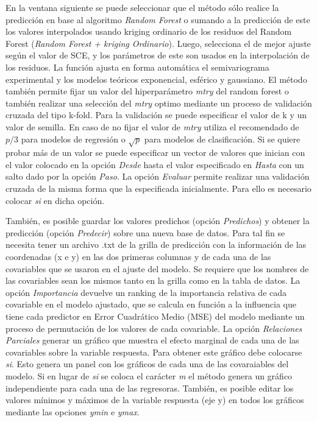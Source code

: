 \documentclass[11pt,b5paper,]{krantz}
\begin{document}
En la ventana siguiente se puede seleccionar que el método sólo realice la predicción en base al algoritmo \emph{Random Forest} o sumando a la predicción de este los valores interpolados usando kriging ordinario de los residuos del Random Forest (\emph{Random Forest + kriging Ordinario}). Luego, selecciona el de mejor ajuste según el valor de SCE, y los parámetros de este son usados en la interpolación de los residuos. La función ajusta en forma automática el semivariograma experimental y los modelos teóricos exponencial, esférico y gaussiano. El método también permite fijar un valor del hiperparámetro \emph{mtry} del random forest o también realizar una selección del \emph{mtry} optimo mediante un proceso de validación cruzada del tipo k-fold. Para la validación se puede especificar el valor de k y un valor de semilla. En caso de no fijar el valor de \emph{mtry} utiliza el recomendado de \(p/3\) para modelos de regresión o \(\sqrt{p}\) para modelos de clasificación. Si se quiere probar más de un valor se puede especificar un vector de valores que inician con el valor colocado en la opción \emph{Desde} hasta el valor especificado en \emph{Hasta} con un salto dado por la opción \emph{Paso}. La opción \emph{Evaluar} permite realizar una validación cruzada de la misma forma que la especificada inicialmente. Para ello es necesario colocar \emph{si} en dicha opción.

También, es posible guardar los valores predichos (opción \emph{Predichos}) y obtener la predicción (opción \emph{Predecir}) sobre una nueva base de datos. Para tal fin se necesita tener un archivo .txt de la grilla de predicción con la información de las coordenadas (x e y) en las dos primeras columnas y de cada una de las covariables que se usaron en el ajuste del modelo. Se requiere que los nombres de las covariables sean los mismos tanto en la grilla como en la tabla de datos. La opción \emph{Importancia} devuelve un ranking de la importancia relativa de cada covariable en el modelo ajustado, que se calcula en función a la influencia que tiene cada predictor en Error Cuadrático Medio (MSE) del modelo mediante un proceso de permutación de los valores de cada covariable. La opción \emph{Relaciones Parciales} generar un gráfico que muestra el efecto marginal de cada una de las covariables sobre la variable respuesta. Para obtener este gráfico debe colocarse \emph{si}. Esto genera un panel con los gráficos de cada una de las covaraiables del modelo. Si en lugar de \emph{si} se coloca el carácter \emph{m} el método genera un gráfico independiente para cada una de las regresoras. También, es posible editar los valores mínimos y máximos de la variable respuesta (eje y) en todos los gráficos mediante las opciones \emph{ymin} e \emph{ymax}.
\end{document}
